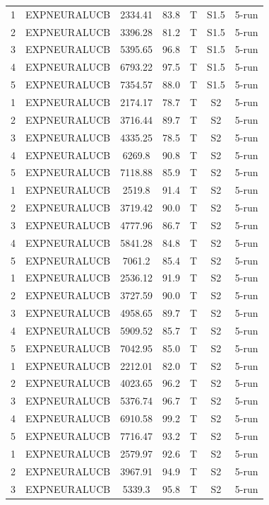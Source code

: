 \documentclass[11pt]{article}
\begin{document}
\begin{center}
\begin{longtable}{|c|c|c|c|c|c|c|}
1 & EXPNEURALUCB & 2334.41 & 83.8 & T & S1.5 & 5-run \\
2 & EXPNEURALUCB & 3396.28 & 81.2 & T & S1.5 & 5-run \\
3 & EXPNEURALUCB & 5395.65 & 96.8 & T & S1.5 & 5-run \\
4 & EXPNEURALUCB & 6793.22 & 97.5 & T & S1.5 & 5-run \\
5 & EXPNEURALUCB & 7354.57 & 88.0 & T & S1.5 & 5-run \\
1 & EXPNEURALUCB & 2174.17 & 78.7 & T & S2 & 5-run \\
2 & EXPNEURALUCB & 3716.44 & 89.7 & T & S2 & 5-run \\
3 & EXPNEURALUCB & 4335.25 & 78.5 & T & S2 & 5-run \\
4 & EXPNEURALUCB & 6269.8 & 90.8 & T & S2 & 5-run \\
5 & EXPNEURALUCB & 7118.88 & 85.9 & T & S2 & 5-run \\
1 & EXPNEURALUCB & 2519.8 & 91.4 & T & S2 & 5-run \\
2 & EXPNEURALUCB & 3719.42 & 90.0 & T & S2 & 5-run \\
3 & EXPNEURALUCB & 4777.96 & 86.7 & T & S2 & 5-run \\
4 & EXPNEURALUCB & 5841.28 & 84.8 & T & S2 & 5-run \\
5 & EXPNEURALUCB & 7061.2 & 85.4 & T & S2 & 5-run \\
1 & EXPNEURALUCB & 2536.12 & 91.9 & T & S2 & 5-run \\
2 & EXPNEURALUCB & 3727.59 & 90.0 & T & S2 & 5-run \\
3 & EXPNEURALUCB & 4958.65 & 89.7 & T & S2 & 5-run \\
4 & EXPNEURALUCB & 5909.52 & 85.7 & T & S2 & 5-run \\
5 & EXPNEURALUCB & 7042.95 & 85.0 & T & S2 & 5-run \\
1 & EXPNEURALUCB & 2212.01 & 82.0 & T & S2 & 5-run \\
2 & EXPNEURALUCB & 4023.65 & 96.2 & T & S2 & 5-run \\
3 & EXPNEURALUCB & 5376.74 & 96.7 & T & S2 & 5-run \\
4 & EXPNEURALUCB & 6910.58 & 99.2 & T & S2 & 5-run \\
5 & EXPNEURALUCB & 7716.47 & 93.2 & T & S2 & 5-run \\
1 & EXPNEURALUCB & 2579.97 & 92.6 & T & S2 & 5-run \\
2 & EXPNEURALUCB & 3967.91 & 94.9 & T & S2 & 5-run \\
3 & EXPNEURALUCB & 5339.3 & 95.8 & T & S2 & 5-run \\

\end{longtable}
\end{center}
\end{document}
